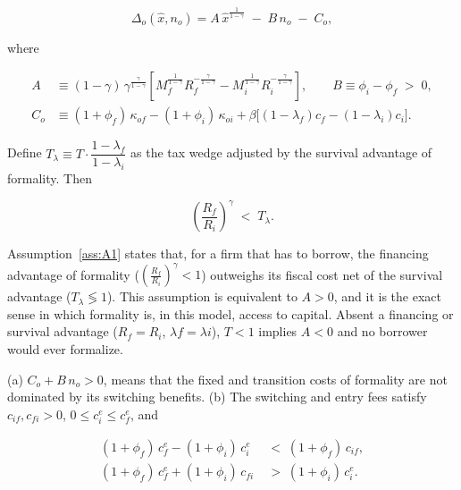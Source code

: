 \documentclass[12pt]{article}
\begin{document}
\begin{equation}
  \Delta_{o}(\hat x,n_{o})
  = A\,\hat x^{\frac{1}{1-\gamma}}
  \;-\; B\,n_{o} \;-\; C_{o},
  \label{eq:toy-Delta-affine}
\end{equation}

where 

\begin{align}
  A &\equiv (1-\gamma)\,\gamma^{\frac{\gamma}{1-\gamma}}
      \left[ M_{f}^{\frac{1}{1-\gamma}}R_{f}^{-\frac{\gamma}{1-\gamma}}
           - M_{i}^{\frac{1}{1-\gamma}}R_{i}^{-\frac{\gamma}{1-\gamma}}
      \right],
  \qquad
  B \equiv \phi_{i}-\phi_{f} \;>\;0,
  \label{eq:toy-AB}\\[2pt]
  C_{o} &\equiv (1+\phi_{f})\,\kappa_{of}
        - (1+\phi_{i})\,\kappa_{oi}
        + \beta\big[(1-\lambda_{f})c_{f}
                   -(1-\lambda_{i})c_{i}\big] .
  \label{eq:toy-C}
\end{align}
 
\begin{assumption}
\label{ass:A1}
Define $T_{\lambda}\equiv T\cdot\dfrac{1-\lambda_{f}}{1-\lambda_{i}}$ as the tax wedge adjusted by the survival advantage of formality. Then

\begin{equation}
  \left(\frac{R_{f}}{R_{i}}\right)^{\gamma}
  \;<\; T_{\lambda} .
  \label{eq:toy-A1}
\end{equation}
\end{assumption}
 
Assumption~\ref{ass:A1} states that, for a firm that has to borrow, the financing advantage of formality ($\left(\frac{R_{f}}{R_{i}}\right)^{\gamma} < 1$) outweighs its fiscal cost net of the survival advantage ($T_{\lambda} \lessgtr 1$). This assumption is equivalent to $A>0$, and it is the exact sense in which formality is, in this model, access to capital. Absent a financing or survival advantage ($R_{f}=R_{i}$, $\lambda{f}=\lambda{i}$), $T<1$ implies $A<0$ and no borrower would ever formalize.
 
\begin{assumption}
\label{ass:A2}
(a) $C_{o}+B\,n_{o}>0$, means that the fixed and transition costs of formality are not dominated by its switching benefits. (b) The switching and entry fees satisfy $c_{if},c_{fi}>0$, $0\leq c^e_{i}\leq c^e_{f}$, and

\begin{align}
  (1+\phi_{f})\,c^e_{f}-(1+\phi_{i})\,c^e_{i}
  \;&<\;(1+\phi_{f})\,c_{if},
  \tag{A2-i}\label{eq:toy-A2i}\\
  (1+\phi_{f})\,c^e_{f}+(1+\phi_{i})\,c_{fi}
  \;&>\;(1+\phi_{i})\,c^e_{i}.
  \tag{A2-ii}\label{eq:toy-A2ii}
\end{align}
\end{assumption}
\end{document}
